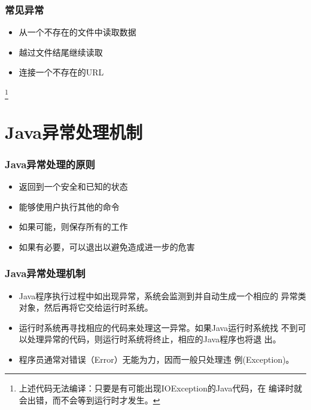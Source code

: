 \begin{frame}[fragile] %
  \frametitle{常见异常}

  
  \begin{itemize}
  \item 从一个不存在的文件中读取数据
  \item 越过文件结尾继续读取
  \item 连接一个不存在的URL
  \end{itemize}

  \footnote{{\kai\Red 上述代码无法编译：只要是有可能出现IOException的Java代码，在
    编译时就会出错，而不会等到运行时才发生。}}

\end{frame}

\section{Java异常处理机制}

\begin{frame}[fragile] %
  \frametitle{Java异常处理的原则}

  \begin{itemize}
  \item 返回到一个安全和已知的状态
  \item 能够使用户执行其他的命令
  \item 如果可能，则保存所有的工作
  \item 如果有必要，可以退出以避免造成进一步的危害
  \end{itemize}
\end{frame}

\begin{frame}[fragile] %
  \frametitle{Java异常处理机制}

  \begin{itemize}[<+-|alert@+>]\kai
  \item Java程序执行过程中如出现异常，系统会监测到并自动生成一个相应的
    异常类对象，然后再将它交给运行时系统。
  \item 运行时系统再寻找相应的代码来处理这一异常。如果Java运行时系统找
    不到可以处理异常的代码，则运行时系统将终止，相应的Java程序也将退
    出。
  \item 程序员通常对错误（Error）无能为力，因而一般只处理违
    例(Exception)。
  \end{itemize}
\end{frame}

